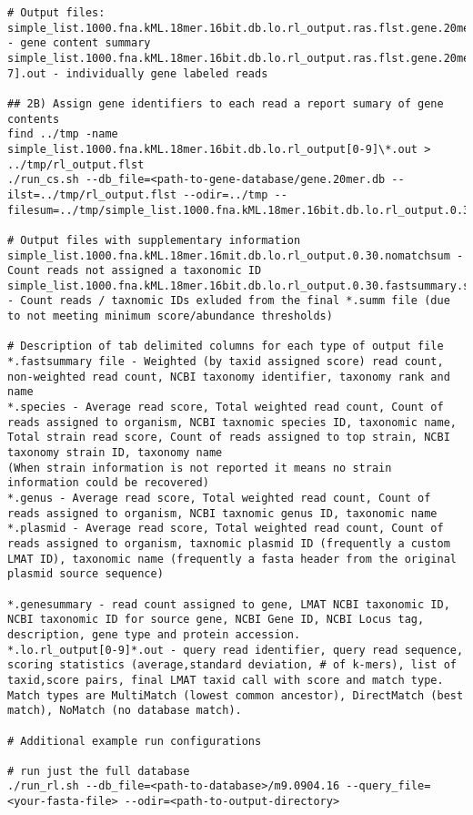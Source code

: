 \documentclass[11pt]{article}
\begin{document}
\begin{verbatim}
# Output files:
simple_list.1000.fna.kML.18mer.16bit.db.lo.rl_output.ras.flst.gene.20mer.db.rl_output.0.01.20.genesummary - gene content summary
simple_list.1000.fna.kML.18mer.16bit.db.lo.rl_output.ras.flst.gene.20mer.db.rl_output[0-7].out - individually gene labeled reads

## 2B) Assign gene identifiers to each read a report sumary of gene contents
find ../tmp -name simple_list.1000.fna.kML.18mer.16bit.db.lo.rl_output[0-9]\*.out > ../tmp/rl_output.flst
./run_cs.sh --db_file=<path-to-gene-database/gene.20mer.db --ilst=../tmp/rl_output.flst --odir=../tmp --filesum=../tmp/simple_list.1000.fna.kML.18mer.16bit.db.lo.rl_output.0.30.fastsummary

# Output files with supplementary information
simple_list.1000.fna.kML.18mer.16mit.db.lo.rl_output.0.30.nomatchsum - Count reads not assigned a taxonomic ID
simple_list.1000.fna.kML.18mer.16bit.db.lo.rl_output.0.30.fastsummary.summ.leftover - Count reads / taxnomic IDs exluded from the final *.summ file (due to not meeting minimum score/abundance thresholds)

# Description of tab delimited columns for each type of output file
*.fastsummary file - Weighted (by taxid assigned score) read count, non-weighted read count, NCBI taxonomy identifier, taxonomy rank and name
*.species - Average read score, Total weighted read count, Count of reads assigned to organism, NCBI taxnomic species ID, taxonomic name, Total strain read score, Count of reads assigned to top strain, NCBI taxonomy strain ID, taxonomy name
(When strain information is not reported it means no strain information could be recovered)
*.genus - Average read score, Total weighted read count, Count of reads assigned to organism, NCBI taxnomic genus ID, taxonomic name
*.plasmid - Average read score, Total weighted read count, Count of reads assigned to organism, taxnomic plasmid ID (frequently a custom LMAT ID), taxonomic name (frequently a fasta header from the original plasmid source sequence)

*.genesummary - read count assigned to gene, LMAT NCBI taxonomic ID, NCBI taxonomic ID for source gene, NCBI Gene ID, NCBI Locus tag, description, gene type and protein accession.
*.lo.rl_output[0-9]*.out - query read identifier, query read sequence, scoring statistics (average,standard deviation, # of k-mers), list of taxid,score pairs, final LMAT taxid call with score and match type. Match types are MultiMatch (lowest common ancestor), DirectMatch (best match), NoMatch (no database match).

# Additional example run configurations

# run just the full database
./run_rl.sh --db_file=<path-to-database>/m9.0904.16 --query_file=<your-fasta-file> --odir=<path-to-output-directory>
\end{verbatim}
\end{document}
